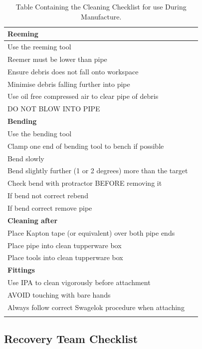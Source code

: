 \documentclass[a4paper,12pt,oneside]{article}
\begin{document}
\begin{appendices}
\begin{longtable}{|m{}|m{}|}
\textbf{Reeming}   &    \\ \hline
Use  the  reeming  tool       &   \\ \hline
Reemer  must  be  lower  than  pipe   &    \\ \hline
Ensure  debris  does  not  fall  onto  workspace    &  \\ \hline
Minimise  debris  falling  further  into  pipe     &        \\ \hline
Use  oil  free  compressed  air  to  clear  pipe  of  debris   &  \\ \hline
DO  NOT  BLOW  INTO  PIPE &    \\ \hline

\textbf{Bending}  &    \\ \hline
Use  the  bending  tool    &    \\ \hline
Clamp  one  end  of  bending  tool  to  bench  if  possible   & \\ \hline
Bend  slowly  &   \\ \hline
Bend  slightly  further  (1  or  2  degrees)  more  than  the  target  & \\ \hline
Check  bend  with  protractor  BEFORE  removing  it  &  \\ \hline
If  bend  not  correct  rebend   &  \\ \hline
If  bend  correct  remove  pipe  &     \\ \hline

\textbf{Cleaning  after}  &  \\ \hline
Place  Kapton  tape  (or  equivalent)  over  both  pipe  ends & \\ \hline
Place  pipe  into  clean  tupperware  box  & \\ \hline
Place  tools  into  clean  tupperware  box   &   \\ \hline

\textbf{Fittings} &    \\ \hline
Use  IPA  to  clean  vigorously  before  attachment &  \\ \hline
AVOID  touching  with  bare  hands  &   \\ \hline
Always  follow  correct  Swagelok  procedure  when  attaching    & \\ \hline     
\caption{Table Containing the Cleaning Checklist for use During Manufacture.}
\label{tab:appcleancheck}
\end{longtable}

\subsection{Recovery Team Checklist}\label{ssec:RecoveryCheck}


\end{appendices}
\end{document}
